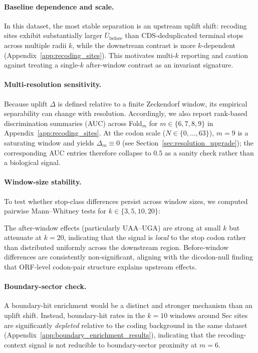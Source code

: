 \paragraph{Baseline dependence and scale.}
In this dataset, the most stable separation is an upstream uplift shift: recoding sites exhibit substantially larger $\overline{U}_{\mathrm{before}}$ than CDS-deduplicated terminal stops across multiple radii $k$, while the downstream contrast is more $k$-dependent (Appendix~\ref{app:recoding_sites}).
This motivates multi-$k$ reporting and caution against treating a single-$k$ after-window contrast as an invariant signature.

\paragraph{Multi-resolution sensitivity.}
Because uplift $\Delta$ is defined relative to a finite Zeckendorf window, its empirical separability can change with resolution.
Accordingly, we also report rank-based discrimination summaries (AUC) across Fold$_m$ for $m\in\{6,7,8,9\}$ in Appendix~\ref{app:recoding_sites}.
At the codon scale ($N\in\{0,\dots,63\}$), $m=9$ is a saturating window and yields $\Delta_m\equiv 0$ (see Section~\ref{sec:resolution_upgrade}); the corresponding AUC entries therefore collapse to $0.5$ as a sanity check rather than a biological signal.

\paragraph{Window-size stability.}
To test whether stop-class differences persist across window sizes, we computed pairwise Mann--Whitney tests for $k\in\{3,5,10,20\}$:

The after-window effects (particularly UAA--UGA) are strong at small $k$ but attenuate at $k=20$, indicating that the signal is \emph{local} to the stop codon rather than distributed uniformly across the downstream region.
Before-window differences are consistently non-significant, aligning with the dicodon-null finding that ORF-level codon-pair structure explains upstream effects.

\paragraph{Boundary-sector check.}
A boundary-hit enrichment would be a distinct and stronger mechanism than an uplift shift.
Instead, boundary-hit rates in the $k=10$ windows around Sec sites are significantly \emph{depleted} relative to the coding background in the same dataset (Appendix~\ref{app:boundary_enrichment_results}), indicating that the recoding-context signal is not reducible to boundary-sector proximity at $m=6$.

